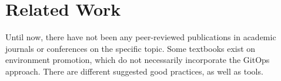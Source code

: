\chapter{Related Work}

Until now, there have not been any peer-reviewed publications
in academic journals or conferences
on the specific topic.
Some textbooks exist on environment promotion, which
do not necessarily incorporate the GitOps approach.
There are different suggested good practices,
as well as tools.

